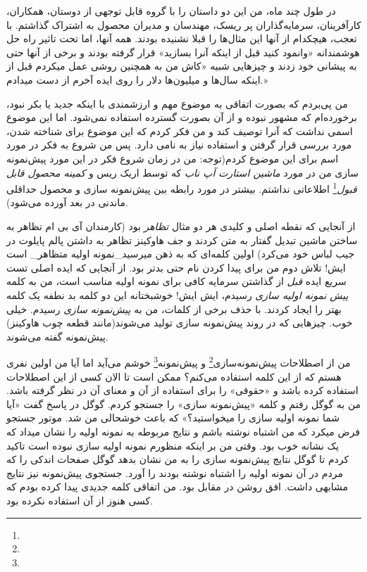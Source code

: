 در طول چند ماه، من این دو داستان را با گروه قابل توجهی از دوستان،
همکاران، کارآفرینان، سرمایه‌گذاران پر ریسک، مهندسان و مدیران محصول به
اشتراک گذاشتم. با تعجب، هیچکدام از آنها این مثال‌ها را قبلا نشنیده
بودند. همه آنها، اما تحت تاثیر راه حل هوشمندانه «وانمود کنید قبل از
اینکه آنرا بسازید» قرار گرفته بودند و برخی از آنها حتی به پیشانی خود
زدند و چیزهایی شبیه «کاش من به همچنین روشی عمل میکردم قبل از اینکه
سال‌ها و میلیون‌ها دلار را روی ایده آخرم از دست میدادم.»

من پی‌بردم که بصورت اتفاقی به موضوع مهم و ارزشمندی با اینکه جدید یا بکر
نبود، برخورده‌ام که مشهور نبوده و از آن بصورت گسترده استفاده نمی‌شود.
اما این موضوع اسمی نداشت که آنرا توصیف کند و من فکر کردم که این موضوع
برای شناخته شدن، مورد بررسی قرار گرفتن و استفاده نیاز به نامی دارد. پس
من شروع به فکر در مورد اسم برای این موضوع کردم(توجه: من در زمان شروع فکر
در این مورد پیش‌نمونه سازی من در مورد \emph{ماشین استارت آپ ناب} که توسط
اریک ریس و \emph{کمینه محصول قابل قبول}\footnote{
   } اطلاعاتی نداشتم. بیشتر در مورد رابطه بین
پیش‌نمونه سازی و محصول حداقلی ماندنی در بعد آورده می‌شود).

از آنجایی که نقطه اصلی و کلیدی هر دو مثال \emph{تظاهر} بود (کارمندان آی
بی ام تظاهر به ساختن ماشین تبدیل گفتار به متن کردند و جف هاوکینز تظاهر
به داشتن پالم پایلوت در جیب لباس خود می‌کرد) اولین کلمه‌ای که به ذهن
میرسید\_‌نمونه اولیه متظاهر\_ است ایش! تلاش دوم من برای پیدا کردن نام
حتی بدتر بود. از آنجایی که ایده‌ اصلی تست سریع ایده \emph{قبل} از گذاشتن
سرمایه کافی برای نمونه اولیه مناسب است، من به کلمه \emph{پیش نمونه اولیه
سازی} رسیدم، ایش ایش! خوشبختانه این دو کلمه بد نطفه یک کلمه بهتر را
ایجاد کردند. با حذف برخی از کلمات، من به \emph{پیش‌نمونه سازی} رسیدم.
خیلی خوب. چیزهایی که در روند پیش‌نمونه سازی تولید می‌شوند(مانند قطعه چوب
هاوکینز) پیش‌نمونه گفته می‌شوند.

من از اصطلاحات پیش‌نمونه‌سازی\footnote{} و
پیش‌نمونه\footnote{} خوشم می‌آید اما آیا من اولین نفری
هستم که از این کلمه استفاده می‌کنم؟ ممکن است تا الان کسی از این اصطلاحات
استفاده کرده باشد و «حقوقی» را برای استفاده از آن و معنای آن در نظر
گرفته باشد. من به گوگل رفتم و کلمه «پیش‌نمونه سازی» را جستجو کردم. گوگل
در پاسخ گفت «آیا شما نمونه اولیه سازی را میخواستید؟» که باعث خوشحالی من
شد. موتور جستجو فرض میکرد که من اشتباه نوشته باشم و نتایج مربوطه به
نمونه اولیه را نشان میداد که یک نشانه خوب بود. وقتی من بر اینکه منظورم
نمونه اولیه سازی نبوده است تاکید کردم تا گوگل نتایج پیش‌نمونه سازی را به
من نشان بدهد گوگل صفحات اندکی را که مردم در آن نمونه اولیه را اشتباه
نوشته بودند را آورد. جستجوی پیش‌نمونه نیز نتایج مشابهی داشت. افق روشن در
مقابل بود. من اتفاقی کلمه جدیدی پیدا کرده بودم که کسی هنوز از آن استفاده
نکرده بود.

